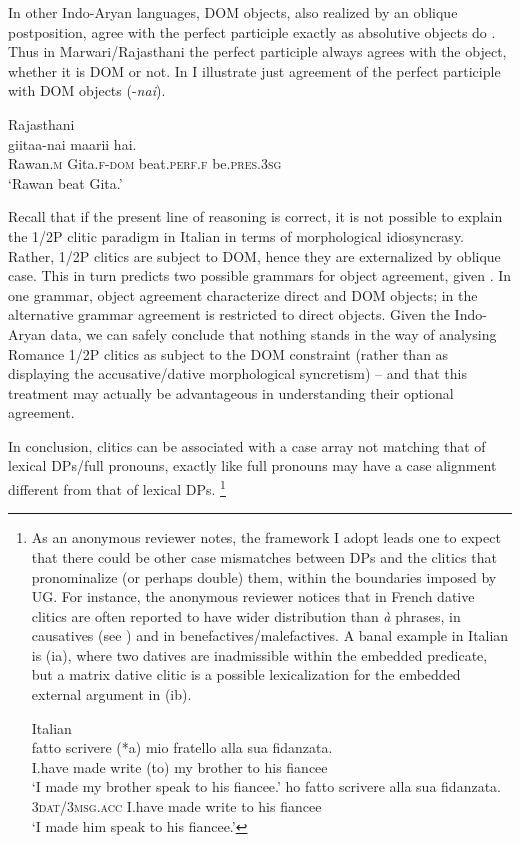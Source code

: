 \documentclass[output=paper,colorlinks,citecolor=brown,nonflat]{./langscibook}
\begin{document}
In other Indo-Aryan languages, DOM objects, also realized by an oblique postposition, agree with the perfect participle exactly as absolutive objects do \emph{\textup{\citep[342]{Masica1991}}}. Thus in Marwari/Rajasthani the perfect participle always agrees with the object, whether it is DOM or not. In  I illustrate just agreement of the perfect participle with DOM objects (-\textit{nai}).

\ea%
    \label{ex:manzini:19}
    Rajasthani \citep{Khokhlova2002}\\
       {giitaa-nai}  {maarii}    {hai}.\\
        Rawan\textsc{.m}   Gita.\textsc{f-dom}   beat.\textsc{perf.f}    be.\textsc{pres.3sg}\\
    \glt ‘Rawan beat Gita.’
\z

Recall that if the present line of reasoning is correct, it is not possible to explain the 1/2P clitic paradigm in Italian in terms of morphological idiosyncrasy. Rather, 1/2P clitics are subject to DOM, hence they are externalized by oblique case. This in turn predicts two possible grammars for object agreement, given . In one grammar, object agreement characterize direct and DOM objects; in the alternative grammar agreement is restricted to direct objects. Given the Indo-Aryan data, we can safely conclude that nothing stands in the way of analysing Romance 1/2P clitics as subject to the DOM constraint (rather than as displaying the accusative/dative morphological syncretism) – and that this treatment may actually be advantageous in understanding their optional agreement.

In conclusion, clitics can be associated with a case array not matching that of lexical DPs/full pronouns, exactly like full pronouns may have a case alignment different from that of lexical DPs.{} \footnote{As an anonymous reviewer notes, the framework I adopt leads one to expect that there could be other case mismatches between DPs and the clitics that pronominalize (or perhaps double) them, within the boundaries imposed by UG. For instance, the anonymous reviewer notices that in French dative clitics are often reported to have wider distribution than \textit{à} phrases, in causatives (see ) and in benefactives/malefactives. A banal example in Italian is (ia), where two datives are inadmissible within the embedded predicate, but a matrix dative clitic is a possible lexicalization for the embedded external argument in (ib).

\ea%

    Italian\\
    \ea {} {fatto} {scrivere} (*a) {mio} {fratello} {alla} {sua} {fidanzata}.\\
        {I.have} made write (to) my brother to his fiancee\\
    \glt `I made my brother speak to his fiancee.'
    \ex {} {ho} {fatto} {scrivere}   {alla} {sua} {fidanzata}.\\
        {3\textsc{dat}/\textsc{3msg.acc}} {I.have} made write   to his fiancee\\
    \glt ‘I made him speak to his fiancee.’
    \z
\z
}
\end{document}
